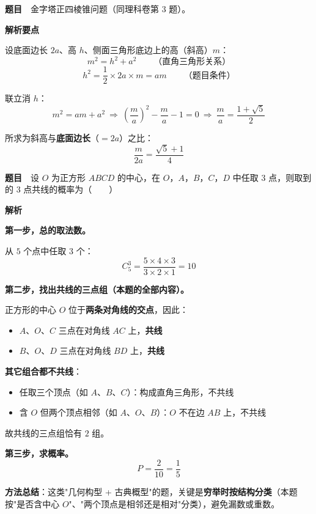 \par\medskip


\textbf{题目}　金字塔正四棱锥问题（同理科卷第 3 题）。

\textbf{解析要点}

设底面边长 $2a$、高 $h$、侧面三角形底边上的高（斜高）$m$：
\[m^{2}=h^{2}+a^{2}\qquad\text{（直角三角形关系）}\]
\[h^{2}=\frac12\times2a\times m=am\qquad\text{（题目条件）}\]

联立消 $h$：
\[m^{2}=am+a^{2}\ \Longrightarrow\ \left(\frac ma\right)^{2}-\frac ma-1=0\ \Longrightarrow\ \frac ma=\frac{1+\sqrt5}2\]

所求为斜高与\textbf{底面边长}（$=2a$）之比：
\[\frac m{2a}=\frac{\sqrt5+1}4\]


\par\medskip


\textbf{题目}　设 $O$ 为正方形 $ABCD$ 的中心，在 $O$，$A$，$B$，$C$，$D$ 中任取 $3$ 点，则取到的 $3$ 点共线的概率为（　　）

\textbf{解析}

\textbf{第一步，总的取法数。}

从 $5$ 个点中任取 $3$ 个：
\[C_5^{3}=\frac{5\times4\times3}{3\times2\times1}=10\]

\textbf{第二步，找出共线的三点组（本题的全部内容）。}

正方形的中心 $O$ 位于\textbf{两条对角线的交点}，因此：
\begin{itemize}
\item $A$、$O$、$C$ 三点在对角线 $AC$ 上，\textbf{共线} 
\item $B$、$O$、$D$ 三点在对角线 $BD$ 上，\textbf{共线} 
\end{itemize}

\textbf{其它组合都不共线}：
\begin{itemize}
\item 任取三个顶点（如 $A$、$B$、$C$）：构成直角三角形，不共线
\item 含 $O$ 但两个顶点相邻（如 $A$、$O$、$B$）：$O$ 不在边 $AB$ 上，不共线
\end{itemize}

故共线的三点组恰有 $2$ 组。

\textbf{第三步，求概率。}
\[P=\frac2{10}=\frac15\]


\begin{gktip}
\textbf{方法总结}：这类"几何构型 + 古典概型"的题，关键是\textbf{穷举时按结构分类}（本题按"是否含中心 $O$"、"两个顶点是相邻还是相对"分类），避免漏数或重数。
\end{gktip}

